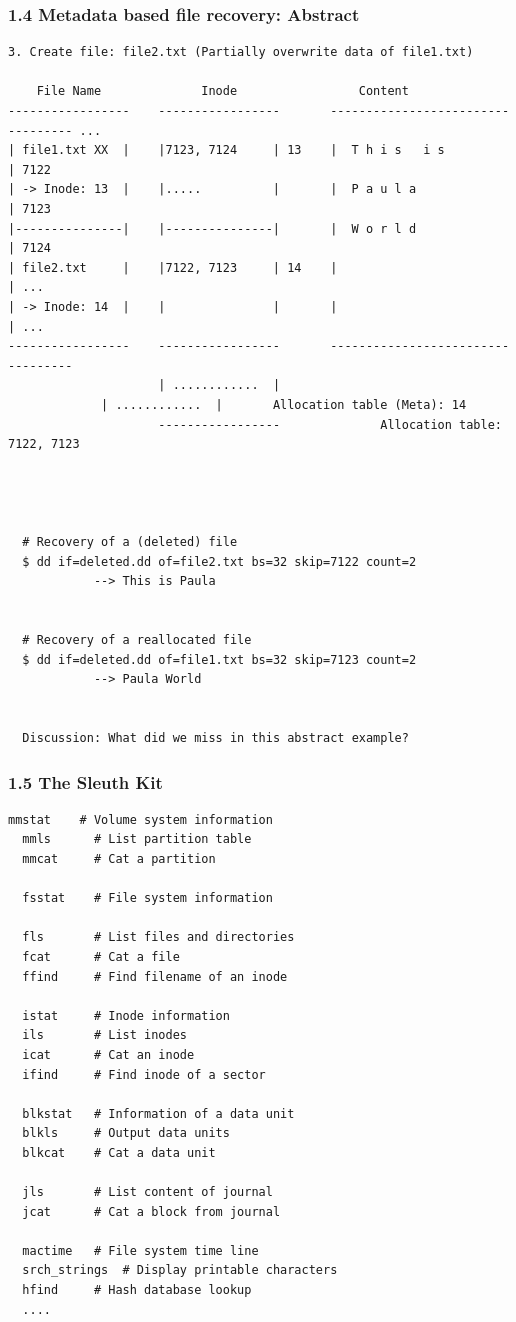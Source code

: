 \begin{frame}[fragile]
  \frametitle{1.4 Metadata based file recovery: Abstract}
  \begin{lstlisting}[basicstyle=\tiny\ttfamily]
3. Create file: file2.txt (Partially overwrite data of file1.txt)

    File Name              Inode                 Content     
-----------------    -----------------       ---------------------------------- ...
| file1.txt XX  |    |7123, 7124     | 13    |  T h i s   i s                 | 7122
| -> Inode: 13  |    |.....          |       |  P a u l a                     | 7123
|---------------|    |---------------|       |  W o r l d                     | 7124
| file2.txt     |    |7122, 7123     | 14    |                                | ...
| -> Inode: 14  |    |               |       |                                | ...
-----------------    -----------------       ---------------------------------- 
                     | ............  |
		     | ............  |       Allocation table (Meta): 14
                     -----------------              Allocation table: 7122, 7123


 

  # Recovery of a (deleted) file
  $ dd if=deleted.dd of=file2.txt bs=32 skip=7122 count=2
            --> This is Paula

  
  # Recovery of a reallocated file
  $ dd if=deleted.dd of=file1.txt bs=32 skip=7123 count=2
            --> Paula World


  Discussion: What did we miss in this abstract example?
  \end{lstlisting}
\end{frame}


\begin{frame}[fragile]
  \frametitle{1.5 The Sleuth Kit}
  \begin{lstlisting}[basicstyle=\tiny\ttfamily]
  mmstat	# Volume system information
  mmls		# List partition table
  mmcat		# Cat a partition

  fsstat	# File system information

  fls		# List files and directories
  fcat		# Cat a file
  ffind		# Find filename of an inode

  istat		# Inode information
  ils		# List inodes
  icat		# Cat an inode
  ifind		# Find inode of a sector

  blkstat	# Information of a data unit
  blkls		# Output data units
  blkcat	# Cat a data unit

  jls		# List content of journal
  jcat		# Cat a block from journal

  mactime	# File system time line
  srch_strings	# Display printable characters
  hfind		# Hash database lookup
  ....
  \end{lstlisting}
\end{frame}


